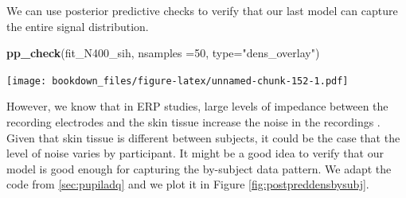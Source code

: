 \documentclass[12pt,]{krantz}
\newenvironment{Shaded}{\begin{snugshade}}{\end{snugshade}}
\newcommand{\KeywordTok}[1]{\textcolor[rgb]{0.13,0.29,0.53}{\textbf{#1}}}
\newcommand{\DataTypeTok}[1]{\textcolor[rgb]{0.13,0.29,0.53}{#1}}
\newcommand{\DecValTok}[1]{\textcolor[rgb]{0.00,0.00,0.81}{#1}}
\newcommand{\StringTok}[1]{\textcolor[rgb]{0.31,0.60,0.02}{#1}}
\newcommand{\NormalTok}[1]{#1}
\theoremstyle{definition}
\theoremstyle{definition}
\theoremstyle{definition}
\theoremstyle{remark}
\begin{document}
We can use posterior predictive checks to verify that our last model can
capture the entire signal distribution.

\begin{Shaded}
\begin{Highlighting}[]
\KeywordTok{pp_check}\NormalTok{(fit_N400_sih, }\DataTypeTok{nsamples =}\DecValTok{50}\NormalTok{, }\DataTypeTok{type=}\StringTok{"dens_overlay"}\NormalTok{)}
\end{Highlighting}
\end{Shaded}

\texttt{[image: bookdown\_files/figure-latex/unnamed-chunk-152-1.pdf]}

However, we know that in ERP studies, large levels of impedance between
the recording electrodes and the skin tissue increase the noise in the
recordings \citep{picton_etal_2000}. Given that skin tissue is different
between subjects, it could be the case that the level of noise varies by
participant. It might be a good idea to verify that our model is good
enough for capturing the by-subject data pattern. We adapt the code from
\ref{sec:pupiladq} and we plot it in Figure
\ref{fig:postpreddensbysubj}.
\end{document}
